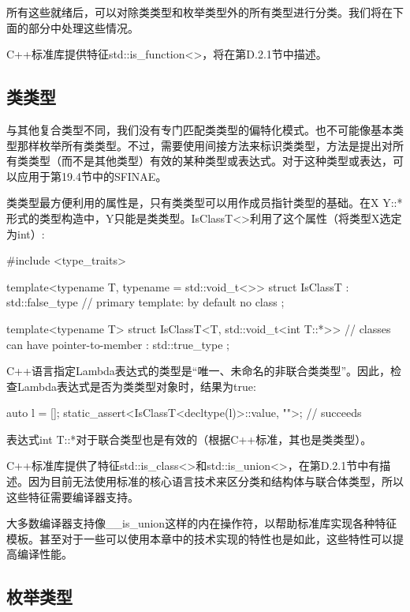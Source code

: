 所有这些就绪后，可以对除类类型和枚举类型外的所有类型进行分类。我们将在下面的部分中处理这些情况。

C++标准库提供特征std::is\_function<>，将在第D.2.1节中描述。

\subsection{类类型}

与其他复合类型不同，我们没有专门匹配类类型的偏特化模式。也不可能像基本类型那样枚举所有类类型。不过，需要使用间接方法来标识类类型，方法是提出对所有类类型（而不是其他类型）有效的某种类型或表达式。对于这种类型或表达，可以应用于第19.4节中的SFINAE。

类类型最方便利用的属性是，只有类类型可以用作成员指针类型的基础。在X Y::*形式的类型构造中，Y只能是类类型。IsClassT<>利用了这个属性（将类型X选定为int）:

\begin{cpp}
#include <type_traits>

template<typename T, typename = std::void_t<>>
struct IsClassT : std::false_type { // primary template: by default no class
};

template<typename T>
struct IsClassT<T, std::void_t<int T::*>> // classes can have pointer-to-member
: std::true_type {};
\end{cpp}

C++语言指定Lambda表达式的类型是“唯一、未命名的非联合类类型”。因此，检查Lambda表达式是否为类类型对象时，结果为true:

\begin{cpp}
auto l = []{};
static_assert<IsClassT<decltype(l)>::value, "">; // succeeds
\end{cpp}

表达式int T::*对于联合类型也是有效的（根据C++标准，其也是类类型）。

C++标准库提供了特征std::is\_class<>和std::is\_union<>，在第D.2.1节中有描述。因为目前无法使用标准的核心语言技术来区分类和结构体与联合体类型，所以这些特征需要编译器支持。

\begin{notice}
大多数编译器支持像\_\_is\_union这样的内在操作符，以帮助标准库实现各种特征模板。甚至对于一些可以使用本章中的技术实现的特性也是如此，这些特性可以提高编译性能。
\end{notice}

\subsection{枚举类型}

